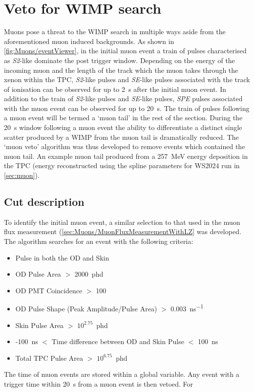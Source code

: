 \section{Veto for WIMP search}\label{sec:Muons/MuonVeto}
Muons pose a threat to the WIMP search in multiple ways aside from the aforementioned muon induced backgrounds. As shown in \autoref{fig:Muons/eventViewer}, in the initial muon event a train of pulses characterised as \textit{S2}-like dominate the post trigger window. Depending on the energy  of the incoming muon and the length of the track which the muon takes through the xenon within the TPC, \textit{S2}-like pulses and \textit{SE}-like pulses associated with the track of ionisation can be observed for up to 2~s after the initial muon event. In addition to the train of \textit{S2}-like pulses and \textit{SE}-like pulses, \textit{SPE} pulses associated with the muon event can be observed for up to 20~s. The train of pulses following a muon event will be termed a `muon tail' in the rest of the section. During the 20~s window following a muon event the ability to differentiate a distinct single scatter produced by a WIMP from the muon tail is dramatically reduced. The `muon veto' algorithm was thus developed to remove events which contained the muon tail. An example muon tail produced from a 257~MeV energy deposition in the TPC (energy reconstructed using the spline parameters for WS2024 run in \autoref{sec:muon}).

\subsection{Cut description}\label{sec:Muons/MuonVetoCutDesc}
To identify the initial muon event, a similar selection to that used in the muon flux measurement (\autoref{sec:Muons/MuonFluxMeasurementWithLZ} was developed. The algorithm searches for an event with the following criteria:
\begin{itemize}
    \item Pulse in both the OD and Skin
    \item OD Pulse Area $>$ 2000~\unit{phd}
    \item OD PMT Coincidence $>$ 100
    \item OD Pulse Shape (Peak Amplitude/Pulse Area) $>$ 0.003~\unit{ns^{-1}}
    \item Skin Pulse Area $>$ $10^{2.75}$~\unit{phd}
    \item -100~\unit{ns} $<$ Time difference between OD and Skin Pulse $<$ 100~\unit{ns}
    \item Total TPC Pulse Area $>$ $10^{6.75}$~\unit{phd}
\end{itemize}
The time of muon events are stored within a global variable. Any event with a trigger time within 20~s from a muon event is then vetoed. For 